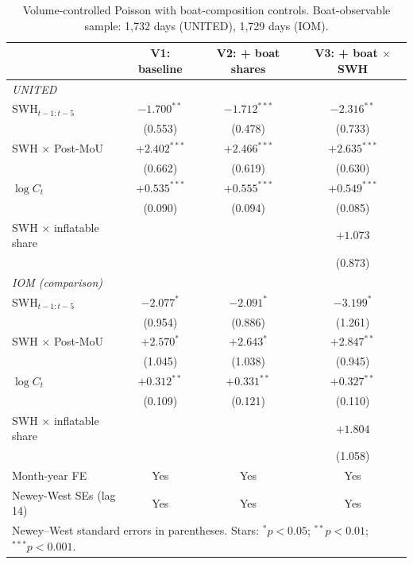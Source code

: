 \begin{table}[H]
\centering
\small
\caption{Volume-controlled Poisson with boat-composition controls. Boat-observable
sample: 1,732 days (UNITED), 1,729 days (IOM).}
\label{tab:appx-boat}
\begin{tabular}{lccc}
\hline
                                & V1: baseline & V2: + boat shares & V3: + boat $\times$ SWH \\
\hline
\multicolumn{4}{l}{\textit{UNITED}} \\
SWH$_{t-1:t-5}$                 & $-1.700^{**}$  & $-1.712^{***}$ & $-2.316^{**}$  \\
                                & (0.553)        & (0.478)        & (0.733)        \\
SWH $\times$ Post-MoU           & $+2.402^{***}$ & $+2.466^{***}$ & $+2.635^{***}$ \\
                                & (0.662)        & (0.619)        & (0.630)        \\
$\log C_t$                      & $+0.535^{***}$ & $+0.555^{***}$ & $+0.549^{***}$ \\
                                & (0.090)        & (0.094)        & (0.085)        \\
SWH $\times$ inflatable share   &                &                & $+1.073$       \\
                                &                &                & (0.873)        \\
\multicolumn{4}{l}{\textit{IOM (comparison)}} \\
SWH$_{t-1:t-5}$                 & $-2.077^{*}$   & $-2.091^{*}$   & $-3.199^{*}$   \\
                                & (0.954)        & (0.886)        & (1.261)        \\
SWH $\times$ Post-MoU           & $+2.570^{*}$   & $+2.643^{*}$   & $+2.847^{**}$  \\
                                & (1.045)        & (1.038)        & (0.945)        \\
$\log C_t$                      & $+0.312^{**}$  & $+0.331^{**}$  & $+0.327^{**}$  \\
                                & (0.109)        & (0.121)        & (0.110)        \\
SWH $\times$ inflatable share   &                &                & $+1.804$       \\
                                &                &                & (1.058)        \\
\hline
Month-year FE                   & Yes            & Yes            & Yes            \\
Newey-West SEs (lag 14)         & Yes            & Yes            & Yes            \\
\hline
\multicolumn{4}{l}{\footnotesize Newey--West standard errors in parentheses. Stars: $^{*}p<0.05$; $^{**}p<0.01$; $^{***}p<0.001$.} \\
\end{tabular}
\end{table}
